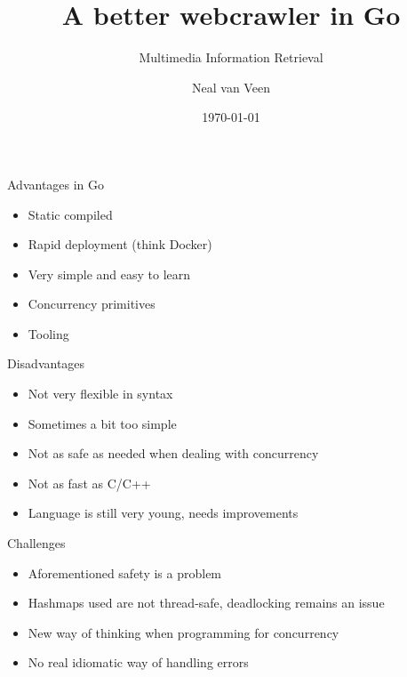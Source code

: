 \documentclass[ignorenonframetext,]{beamer}
\title{A better webcrawler in Go}
\subtitle{Multimedia Information Retrieval}
\author{Neal van Veen}
\date{\today}
\begin{document}
\frame{\titlepage}

\begin{frame}{Advantages in Go}

\begin{itemize}
\itemsep1pt\parskip0pt
\item
  Static compiled
\item
  Rapid deployment (think Docker)
\item
  Very simple and easy to learn
\item
  Concurrency primitives
\item
  Tooling
\end{itemize}

\end{frame}

\begin{frame}{Disadvantages}

\begin{itemize}
\itemsep1pt\parskip0pt
\item
  Not very flexible in syntax
\item
  Sometimes a bit too simple
\item
  Not as safe as needed when dealing with concurrency
\item
  Not as fast as C/C++
\item
  Language is still very young, needs improvements
\end{itemize}

\end{frame}

\begin{frame}{Challenges}

\begin{itemize}
\itemsep1pt\parskip0pt
\item
  Aforementioned safety is a problem
\item
  Hashmaps used are not thread-safe, deadlocking remains an issue
\item
  New way of thinking when programming for concurrency
\item
  No real idiomatic way of handling errors
\end{itemize}

\end{frame}
\end{document}
